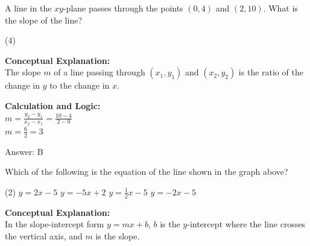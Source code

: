 \documentclass[11pt,paper=a4,answers]{exam}
\begin{document}
\begin{questions}
\pointsinrightmargin
\pointsdroppedatright
\marksnotpoints
{}
\pointformat{\boldmath\themarginpoints}
\bracketedpoints


\question
A line in the $xy$-plane passes through the points $(0, 4)$ and $(2, 10)$. What is the slope of the line?
\begin{tasks}(4)
\end{tasks}

\begin{solution}
\textbf{Conceptual Explanation:} \\
The slope $m$ of a line passing through $(x_1, y_1)$ and $(x_2, y_2)$ is the ratio of the change in $y$ to the change in $x$.

\vspace{10pt}
\textbf{Calculation and Logic:} \\
$m = \frac{y_2 - y_1}{x_2 - x_1} = \frac{10 - 4}{2 - 0}$ \\
$m = \frac{6}{2} = 3$

\vspace{15pt}
Answer: \colorbox{yellow!100}{B}
\end{solution}

\vspace{20pt}

\question

Which of the following is the equation of the line shown in the graph above?
\begin{tasks}(2)
    \task $y = 2x - 5$
    \task $y = -5x + 2$
    \task $y = \frac{1}{2}x - 5$
    \task $y = -2x - 5$
\end{tasks}
\begin{center}
\end{center}
\begin{solution}
\textbf{Conceptual Explanation:} \\
In the slope-intercept form $y = mx + b$, $b$ is the $y$-intercept where the line crosses the vertical axis, and $m$ is the slope.


\end{solution}
\end{questions}
\end{document}

